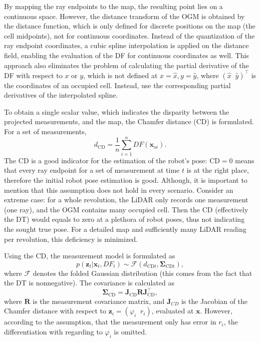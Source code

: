 By mapping the ray endpoints to the map, the resulting point lies
on a continuous space.
However, the distance transform of the OGM is obtained by
the distance function, which is only defined for discrete positions
on the map (the cell midpoints), not for continuous coordinates.
Instead of the quantization of the ray endpoint coordinates, a cubic spline
interpolation is applied on the distance field,
enabling the evaluation of the DF for continuous coordinates as well.
This approach also eliminates the problem of calculating the
partial derivative of the DF with respect to $x$ or $y$,
which is not defined at $x = \hat{x}, y = \hat{y}$, where
$(\hat{x}\;\; \hat{y})^{\top}$ is the coordinates of an occupied cell.
Instead, use the corresponding partial derivatives of the interpolated spline.


To obtain a single scalar value, which indicates the disparity between the projected measurements,
and the map, the Chamfer distance (CD) is formulated. For a set of measurements,
\begin{equation}
    d_{\text{CD}} = \frac{1}{n}\sum_{i=1}^nDF(\mathbf{x}_{\text{o}i}).
\end{equation}
The CD is a good indicator for the estimation of the robot's pose: $\mathrm{CD}=0$ means
that every ray endpoint for a set of measurement at time $t$ is at the right place,
therefore the initial robot pose estimation is good.
Although, it is important to mention that this assumption does not hold in every
scenario. Consider an extreme case: for a whole revolution, the LiDAR only records
one measurement (one ray), and the OGM contains many occupied cell.
Then the CD (effectively the DT) would equals to zero at a plethora of robot poses, thus not indicating the sought true pose.
For a detailed map and sufficiently many LiDAR reading per revolution, this deficiency is minimized.

Using the CD, the measurement model is formulated as
\begin{equation}
    p(\mathbf{\mathbf{z}}_t | \mathbf{x}_t, DF_t) \sim \mathcal{F}(d_{\text{CD}t},\boldsymbol\Sigma_{\text{CDt}}),
\end{equation}
where $\mathcal{F}$ denotes the folded Gaussian distribution (this comes from the fact that the DT is nonnegative).
The covariance is calculated as
\begin{equation}
    \boldsymbol\Sigma_{\text{CD}} = \mathbf{J}_{\text{CD}}\mathbf{R}\mathbf{J}_{\text{CD}}^{\top},
\end{equation}
where $\mathbf{R}$ is the measurement covariance matrix, and $\mathbf{J}_{CD}$ is the Jacobian of the
Chamfer distance with respect to $\mathbf{z}_i = (\varphi_i\;\;r_i)$,
evaluated at $\mathbf{x}$. However, according to the assumption, that the measurement only has error
in $r_i$, the differentiation with regarding to $\varphi_i$ is omitted.

